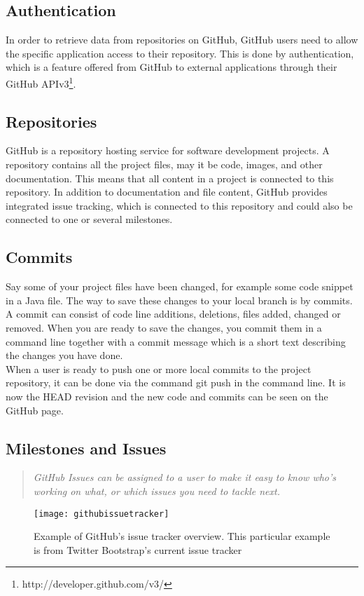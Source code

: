 \subsection{Authentication}
In order to retrieve data from repositories on GitHub, GitHub users need to allow the specific application access to their repository. This is done by authentication, which is a feature offered from GitHub to external applications through their GitHub APIv3\footnote{http://developer.github.com/v3/}. 
\subsection{Repositories}
GitHub is a repository hosting service for software development projects. A repository contains all the project files, may it be code, images, and other documentation. This means that all content in a project is connected to this repository. In addition to documentation and file content, GitHub provides integrated issue tracking, which is connected to this repository and could also be connected to one or several milestones. 
\subsection{Commits}
Say some of your project files have been changed, for example some code snippet in a Java file. The way to save these changes to your local branch is by commits. A commit can consist of code line additions, deletions, files added, changed or removed. When you are ready to save the changes, you commit them in a command line together with a commit message which is a short text describing the changes you have done. \\
When a user is ready to push one or more local commits to the project repository, it can be done via the command git push in the command line. It is now the HEAD revision and the new code and commits can be seen on the GitHub page.
\subsection{Milestones and Issues}
\begin{quote}
\em GitHub Issues can be assigned to a user to make it easy to know who's working on what, or which issues you need to tackle next.
\end{quote}
\begin{figure}[H]
\centering
	\texttt{[image: githubissuetracker]}
\caption{Example of GitHub's issue tracker overview. This particular example is from Twitter Bootstrap's current issue tracker}
\label{githubissuetracker}
\end{figure}

